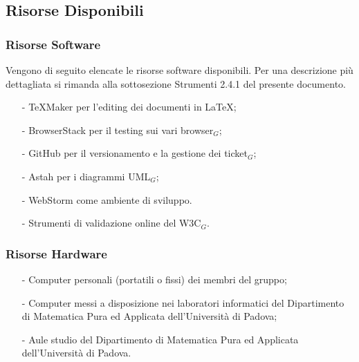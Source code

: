 \subsection{Risorse Disponibili}
\subsubsection{Risorse Software}
Vengono di seguito elencate le risorse software disponibili. Per una descrizione più dettagliata si rimanda alla sottosezione Strumenti 2.4.1 del presente documento.
\begin{itemize}
	\item[-] TeXMaker per l'editing dei documenti in \LaTeX;
	\item[-] BrowserStack per il testing sui vari browser$_G$;
	\item[-] GitHub per il versionamento e la gestione dei ticket$_G$;
	\item[-] Astah per i diagrammi UML$_G$;
	\item[-] WebStorm come ambiente di sviluppo.
	\item[-] Strumenti di validazione online del W3C$_G$.
\end{itemize}

\subsubsection{Risorse Hardware}
\begin{itemize}
	\item[-] Computer personali (portatili o fissi) dei membri del gruppo; 
	\item[-] Computer messi a disposizione nei laboratori informatici del Dipartimento di Matematica Pura ed Applicata dell'Università di Padova;
	\item[-] Aule studio del Dipartimento di Matematica Pura ed Applicata
	dell'Università di Padova. 
\end{itemize}